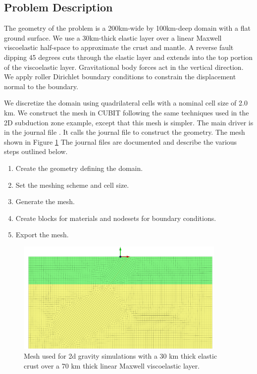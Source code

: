 \subsection{Problem Description}

The geometry of the problem is a 200km-wide by 100km-deep domain with
a flat ground surface. We use a 30km-thick elastic layer over a linear
Maxwell viscoelastic half-space to approximate the crust and mantle.
A reverse fault dipping 45 degrees cuts through the elastic layer
and extends into the top portion of the viscoelastic layer. Gravitational
body forces act in the vertical direction. We apply roller Dirichlet
boundary conditions to constrain the displacement normal to the boundary.

We discretize the domain using quadrilateral cells with a nominal
cell size of 2.0 km. We construct the mesh in CUBIT following the
same techniques used in the 2D subduction zone example, except that
this mesh is simpler. The main driver is in the journal file .
It calls the journal file  to construct the geometry.
The mesh shown in Figure \ref{fig:examples:gravity:2d:mesh} The journal
files are documented and describe the various steps outlined below.
\begin{enumerate}
\item Create the geometry defining the domain.
\item Set the meshing scheme and cell size.
\item Generate the mesh.
\item Create blocks for materials and nodesets for boundary conditions.
\item Export the mesh.
\end{enumerate}

\begin{figure}
  \includegraphics[width=4in]{examples/figs/grav2d_mesh}
  \caption{Mesh used for 2d gravity simulations with a 30 km thick elastic crust
    over a 70 km thick linear Maxwell viscoelastic layer.}
  \label{fig:examples:gravity:2d:mesh}
\end{figure}


